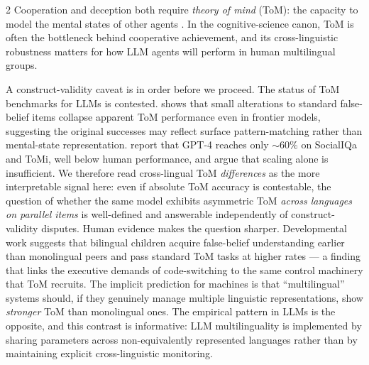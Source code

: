 \documentclass[openacc]{rsproca_new}
\begin{document}
\begin{multicols}{2}
Cooperation and deception both require \emph{theory of mind} (ToM): the capacity to model the mental states of other agents \cite{premack1978tom, deweerd2013bayesiantom}. In the cognitive-science canon, ToM is often the bottleneck behind cooperative achievement, and its cross-linguistic robustness matters for how LLM agents will perform in human multilingual groups.

A construct-validity caveat is in order before we proceed. The status of ToM benchmarks for LLMs is contested. \citeauthor{ullman2023tomfail} \cite{ullman2023tomfail} shows that small alterations to standard false-belief items collapse apparent ToM performance even in frontier models, suggesting the original successes may reflect surface pattern-matching rather than mental-state representation. \citeauthor{sap2022neuraltom} \cite{sap2022neuraltom} report that GPT-4 reaches only $\sim 60\%$ on SocialIQa and ToMi, well below human performance, and argue that scaling alone is insufficient. We therefore read cross-lingual ToM \emph{differences} as the more interpretable signal here: even if absolute ToM accuracy is contestable, the question of whether the same model exhibits asymmetric ToM \emph{across languages on parallel items} is well-defined and answerable independently of construct-validity disputes. Human evidence makes the question sharper. Developmental work suggests that bilingual children acquire false-belief understanding earlier than monolingual peers and pass standard ToM tasks at higher rates \cite{kovacs2009bilingual, goetz2003bilingual} --- a finding that links the executive demands of code-switching to the same control machinery that ToM recruits. The implicit prediction for machines is that ``multilingual'' systems should, if they genuinely manage multiple linguistic representations, show \emph{stronger} ToM than monolingual ones. The empirical pattern in LLMs is the opposite, and this contrast is informative: LLM multilinguality is implemented by sharing parameters across non-equivalently represented languages rather than by maintaining explicit cross-linguistic monitoring.


\end{multicols}
\end{document}

